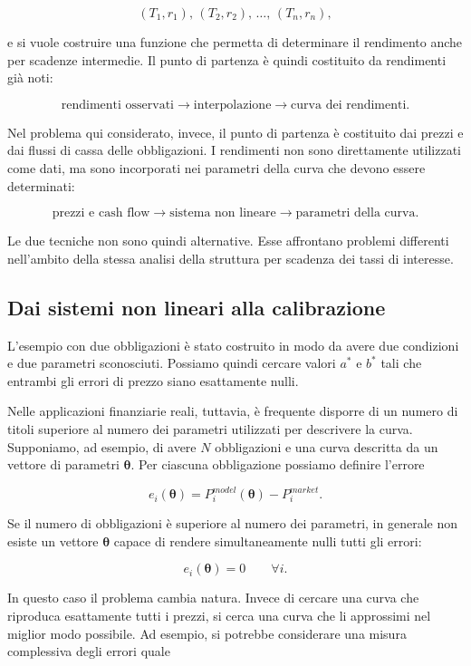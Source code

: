 \[
(T_1,r_1),\,
(T_2,r_2),\,
\ldots,\,
(T_n,r_n),
\]

e si vuole costruire una funzione che permetta di determinare il rendimento anche per scadenze intermedie. Il punto di partenza è quindi costituito da rendimenti già noti:

\[
\text{rendimenti osservati}
\longrightarrow
\text{interpolazione}
\longrightarrow
\text{curva dei rendimenti}.
\]

Nel problema qui considerato, invece, il punto di partenza è costituito dai prezzi e dai flussi di cassa delle obbligazioni. I rendimenti non sono direttamente utilizzati come dati, ma sono incorporati nei parametri della curva che devono essere determinati:

\[
\text{prezzi e cash flow}
\longrightarrow
\text{sistema non lineare}
\longrightarrow
\text{parametri della curva}.
\]

Le due tecniche non sono quindi alternative. Esse affrontano problemi differenti nell'ambito della stessa analisi della struttura per scadenza dei tassi di interesse.

\subsection{Dai sistemi non lineari alla calibrazione}

L'esempio con due obbligazioni è stato costruito in modo da avere due condizioni e due parametri sconosciuti. Possiamo quindi cercare valori $a^*$ e $b^*$ tali che entrambi gli errori di prezzo siano esattamente nulli.

Nelle applicazioni finanziarie reali, tuttavia, è frequente disporre di un numero di titoli superiore al numero dei parametri utilizzati per descrivere la curva. Supponiamo, ad esempio, di avere $N$ obbligazioni e una curva descritta da un vettore di parametri $\boldsymbol{\theta}$. Per ciascuna obbligazione possiamo definire l'errore

\[
e_i(\boldsymbol{\theta})
=
P_i^{model}(\boldsymbol{\theta})
-
P_i^{market}.
\]

Se il numero di obbligazioni è superiore al numero dei parametri, in generale non esiste un vettore $\boldsymbol{\theta}$ capace di rendere simultaneamente nulli tutti gli errori:

\[
e_i(\boldsymbol{\theta})=0
\qquad
\forall i.
\]

In questo caso il problema cambia natura. Invece di cercare una curva che riproduca esattamente tutti i prezzi, si cerca una curva che li approssimi nel miglior modo possibile. Ad esempio, si potrebbe considerare una misura complessiva degli errori quale

